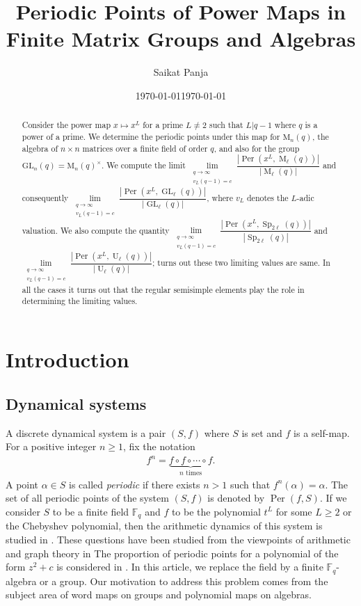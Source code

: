 \documentclass[11pt,twoside]{amsart}
\title[Periodic points for power maps]{Periodic Points of Power Maps in Finite Matrix Groups and Algebras}
\date{\today}
\author[Saikat Panja]{Saikat Panja\orcidlink{0000-0002-9639-3122}}
\date{\today}
\newcommand{\GL}{\mathrm{GL}}
\newcommand{\M}{\mathrm{M}}
\newcommand{\F}{\mathbb{F}}
\newcommand{\per}{\operatorname{Per}}
\theoremstyle{definition} %
\begin{document}
\begin{abstract}
Consider the power map $x\mapsto x^L$ for a prime $L\neq 2$ such that $L|q-1$ where $q$ is a power of a prime.
We determine the periodic points under this map for $\M_n(q)$, the algebra of $n\times n $ matrices over a finite field of order $q$, and also for the group $\GL_n(q)=\M_n(q)^\times$.
We compute the limit $      \lim\limits_{\substack{q\longrightarrow \infty\\v_L(q-1)=c}}\dfrac{\left|\operatorname{Per}(x^L,\operatorname{M}_\ell(q))\right|}{|\operatorname{M}_\ell(q)|}$ and consequently $\lim\limits_{\substack{q\longrightarrow \infty\\
    v_L(q-1)=c}}\dfrac{\left|\operatorname{Per}(x^L,\operatorname{GL}_\ell(q))\right|}{|\operatorname{GL}_\ell(q)|}$, where $v_L$ denotes the $L$-adic valuation. We also compute the quantity $\lim\limits_{\substack{q\longrightarrow \infty\\
    v_L(q-1)=c}}\dfrac{\left|\operatorname{Per}(x^L,\operatorname{Sp}_{2\ell}(q))\right|}{|\operatorname{Sp}_{2\ell}(q)|}$ and $\lim\limits_{\substack{q\longrightarrow \infty\\
    v_L(q-1)=c}}\dfrac{\left|\operatorname{Per}(x^L,\operatorname{U}_\ell(q))\right|}{|\operatorname{U}_\ell(q)|}$; turns out these two limiting values are same.
    In all the cases it turns out that the regular semisimple elements play the role in determining the limiting values.
\end{abstract}
\maketitle
\section{Introduction}\label{sec:intro}
\subsection{Dynamical systems} A discrete dynamical system is a pair $(S,f)$ where $S$ is set and $f$ is a self-map. 
For a positive integer $n\geq 1$, fix the notation 
\begin{align*}
    f^n=\underbrace{f\circ f\circ \cdots \circ f}_{n\text{ times}}.
\end{align*}
A point $\alpha\in S$ is called \emph{periodic} if there exists $n>1$ such that $f^n(\alpha)=\alpha$.
The set of all periodic points of the system $(S,f)$ is denoted by $\per(f, S)$.
If we consider $S$ to be a finite field $\F_q$ and $f$ to be the polynomial $t^L$ for some $L\geq 2$ or the Chebyshev polynomial, then the arithmetic dynamics of this system is studied in \cite{ManesThompson2019}.
These questions have been studied from the viewpoints of arithmetic and graph theory in \cite{ShaHu2011}
The proportion of periodic points for a polynomial of the form $z^2+c$ is considered in \cite{Madhu2011}.
In this article, we replace the field by a finite $\F_q$-algebra or a group. 
Our motivation to address this problem comes from the subject area of word maps on groups and polynomial maps on algebras.
\end{document}
